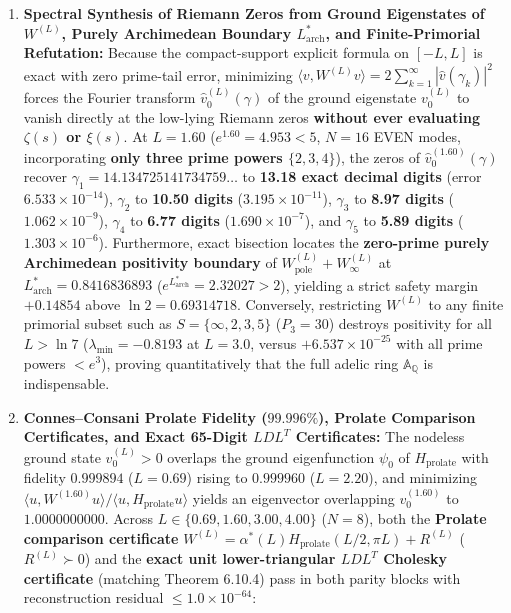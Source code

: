 \documentclass[
  11pt,
]{article}
\begin{document}
\begin{enumerate}
{\begin{longtable}[]
  \(+5.2961 \times 10^{-29}\) & \(+1.2239 \times 10^{-26}\) & Deep
  off-line (\(m_4 \dots m_{10} > 0\)) \\
  \end{longtable}
  }
\item
  \textbf{Spectral Synthesis of Riemann Zeros from Ground Eigenstates of
  \(W^{(L)}\), Purely Archimedean Boundary \(L_{\text{arch}}^*\), and
  Finite-Primorial Refutation:} Because the compact-support explicit
  formula on \([-L, L]\) is exact with zero prime-tail error, minimizing
  \(\langle v, W^{(L)} v \rangle = 2\sum_{k=1}^\infty |\widehat{v}(\gamma_k)|^2\)
  forces the Fourier transform \(\widehat{v}_0^{(L)}(\gamma)\) of the
  ground eigenstate \(v_0^{(L)}\) to vanish directly at the low-lying
  Riemann zeros \textbf{without ever evaluating \(\zeta(s)\) or
  \(\xi(s)\)}. At \(L = 1.60\) (\(e^{1.60} = 4.953 < 5\), \(N = 16\)
  EVEN modes, incorporating \textbf{only three prime powers
  \(\{2, 3, 4\}\)}), the zeros of \(\widehat{v}_0^{(1.60)}(\gamma)\)
  recover \(\gamma_1 = 14.134725141734759\dots\) to \textbf{13.18 exact
  decimal digits} (error \(6.533 \times 10^{-14}\)), \(\gamma_2\) to
  \textbf{10.50 digits} (\(3.195 \times 10^{-11}\)), \(\gamma_3\) to
  \textbf{8.97 digits} (\(1.062 \times 10^{-9}\)), \(\gamma_4\) to
  \textbf{6.77 digits} (\(1.690 \times 10^{-7}\)), and \(\gamma_5\) to
  \textbf{5.89 digits} (\(1.303 \times 10^{-6}\)). Furthermore, exact
  bisection locates the \textbf{zero-prime purely Archimedean positivity
  boundary} of \(W_{\text{pole}}^{(L)} + W_\infty^{(L)}\) at
  \(L_{\text{arch}}^* = 0.8416836893\)
  (\(e^{L_{\text{arch}}^*} = 2.32027 > 2\)), yielding a strict safety
  margin \(+0.14854\) above \(\ln 2 = 0.69314718\). Conversely,
  restricting \(W^{(L)}\) to any finite primorial subset such as
  \(S = \{\infty, 2, 3, 5\}\) (\(P_3 = 30\)) destroys positivity for all
  \(L > \ln 7\) (\(\lambda_{\min} = -0.8193\) at \(L = 3.0\), versus
  \(+6.537 \times 10^{-25}\) with all prime powers \(< e^3\)), proving
  quantitatively that the full adelic ring \(\mathbb{A}_\mathbb{Q}\) is
  indispensable.
\item
  \textbf{Connes--Consani Prolate Fidelity (\(99.996\%\)), Prolate
  Comparison Certificates, and Exact 65-Digit \(LDL^T\) Certificates:}
  The nodeless ground state \(v_0^{(L)} > 0\) overlaps the ground
  eigenfunction \(\psi_0\) of \(H_{\text{prolate}}\) with fidelity
  \(0.999894\) (\(L=0.69\)) rising to \textbf{\(0.999960\)}
  (\(L=2.20\)), and minimizing
  \(\langle u, W^{(1.60)} u \rangle / \langle u, H_{\text{prolate}} u \rangle\)
  yields an eigenvector overlapping \(v_0^{(1.60)}\) to
  \(1.0000000000\). Across \(L \in \{0.69, 1.60, 3.00, 4.00\}\)
  (\(N = 8\)), both the \textbf{Prolate comparison certificate}
  \(W^{(L)} = \alpha^*(L) H_{\text{prolate}}(L/2, \pi L) + R^{(L)}\)
  (\(R^{(L)} \succ 0\)) and the \textbf{exact unit lower-triangular
  \(LDL^T\) Cholesky certificate} (matching Theorem 6.10.4) pass in both
  parity blocks with reconstruction residual
  \(\le 1.0 \times 10^{-64}\):


\end{enumerate}
\end{document}
